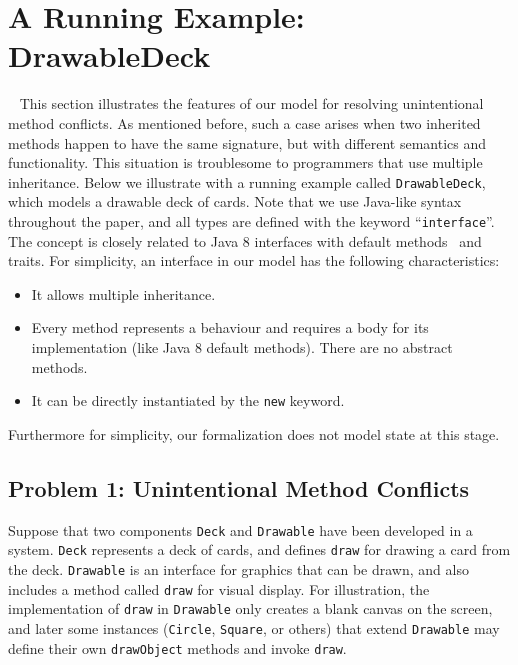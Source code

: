 \section{A Running Example: DrawableDeck}~\label{sec:overview}
This section illustrates the features of our \MIM{} model for
resolving unintentional method conflicts. As mentioned before, such a
case arises when two inherited methods happen to have the same
signature, but with different semantics and functionality. This
situation is troublesome to programmers that use multiple
inheritance. Below we illustrate with a running example called
\lstinline|DrawableDeck|, which models a drawable deck of cards. 
Note that we use Java-like syntax
throughout the paper, and all types are defined with the keyword
``\lstinline|interface|''. The concept is closely related to Java 8
interfaces with default methods~\cite{bono14} and traits. For simplicity, an interface in our model has
the following characteristics:
\begin{itemize}
	\item It allows multiple inheritance.
	\item Every method represents a behaviour and requires a body for its implementation (like Java 8 default methods). There are no abstract methods.
	\item It can be directly instantiated by the \lstinline|new| keyword.
\end{itemize}
Furthermore for simplicity, our formalization does not model state at
this stage. %

\subsection{Problem 1: Unintentional Method Conflicts}
Suppose that two components \lstinline|Deck| and \lstinline|Drawable| 
have been developed in a system.  \lstinline|Deck| represents a deck
of cards, and defines \lstinline|draw| for drawing a card from the
deck.  \lstinline|Drawable| is an interface for graphics that
can be drawn, and also includes a method called \lstinline|draw| for
visual display. For illustration, the implementation of
\lstinline|draw| in \lstinline|Drawable| only creates a blank canvas
on the screen, and later some instances (\lstinline|Circle|,
\lstinline|Square|, or others) that extend \lstinline|Drawable| may
define their own \lstinline|drawObject| methods and invoke
\lstinline|draw|.

